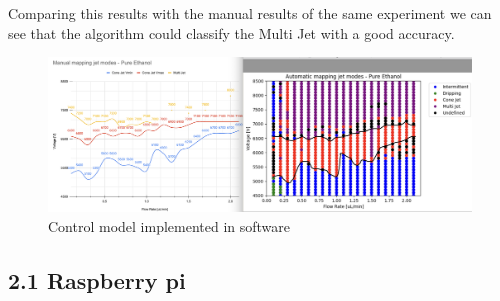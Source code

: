     Comparing this results with the manual results of the same experiment we can see that the algorithm could classify the Multi Jet with a good accuracy.

    \begin{figure}[H]
        \center
        \includegraphics[width=18cm]{images/image_folder_report_4/map7-comparison.png}
        \caption{Control model implemented in software}
    \end{figure}



\subsection*{2.1 Raspberry pi}
